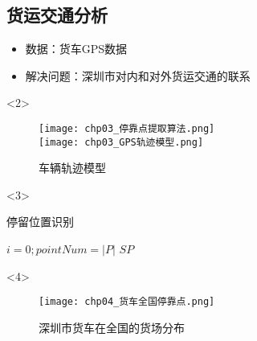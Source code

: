 \subsection{货运交通分析}
\begin{frame}[t]{\subsecname}
\begin{itemize}
\item 数据：货车GPS数据
\item 解决问题：深圳市对内和对外货运交通的联系 
\end{itemize}

\begin{overlayarea}{\textwidth}{\textheight}
  \begin{onlyenv}<2>
\begin{figure}
  \centering
  \texttt{[image: chp03\_停靠点提取算法.png]} \\
  \texttt{[image: chp03\_GPS轨迹模型.png]}
  \caption{车辆轨迹模型}
\end{figure}
  \end{onlyenv}

  \begin{onlyenv}<3>
\begin{algorithm}[H] \tiny
     \caption*{停留位置识别}
     \BlankLine    
     $i=0; pointNum=\left| P \right|$\;
      \Return $SP$\;                 
\end{algorithm}
  \end{onlyenv}

\vspace{-10pt}
  \begin{onlyenv}<4>
\begin{figure}
  \centering
  \texttt{[image: chp04\_货车全国停靠点.png]}
  \caption{深圳市货车在全国的货场分布}
\end{figure}
  \end{onlyenv}


\end{overlayarea}
\end{frame}
